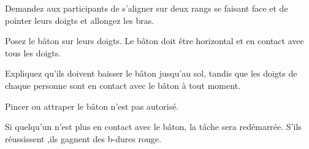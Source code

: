 \documentclass{grand-jeu}
\begin{document}
\begin{liste-materiel}
\end{liste-materiel}

\begin{regles}
Demandez aux participants de s’aligner sur deux rangs se faisant face et de pointer leurs doigts et allongez les bras.

Posez le bâton sur leurs doigts. Le bâton doit être horizontal et en contact avec tous les doigts.

Expliquez qu’ils doivent baisser le bâton jusqu’au sol, tandis que les doigts de chaque personne sont en contact avec le bâton à tout moment.

Pincer ou attraper le bâton n’est pas autorisé.

Si quelqu’un n’est plus en contact avec le bâton, la tâche sera redémarrée.
S'ils réussissent ,ils gagnent des b-dures rouge.
\end{regles}

\begin{moments-stop}
\end{moments-stop}
\end{document}
